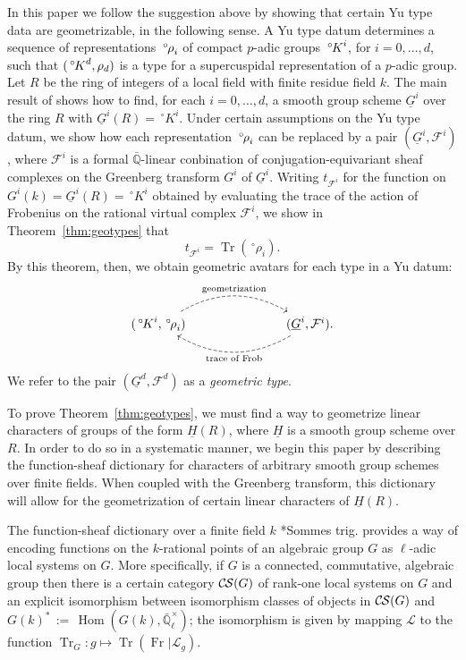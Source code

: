 \documentclass[10pt]{amsart}
\theoremstyle{plain}
\theoremstyle{definition}
\newcommand{\QQ}{{\mathbb{Q}}}
\newcommand{\EE}{\mathbb{\bar Q}_\ell}
\newcommand{\EEx}{\EE^\times}
\newcommand{\Frob}[1]{\operatorname{Fr}_{#1}}
\DeclareMathOperator{\Hom}{Hom}
\DeclareMathOperator{\trace}{Tr}
\newcommand{\ceq}{{\, :=\, }}
\newcommand{\trFrob}[1]{t_{#1}}
\DeclareMathOperator{\Tr}{Tr}
\newcommand{\TrFrob}[1]{\Tr_{#1}}
\newcommand{\cs}[1]{{\mathcal{#1}}}
\newcommand{\CS}{{\mathcal{C\hskip-0.8pt S}}}
\newcommand{\oK}{{\,^\circ \hskip-1pt K}}
\newcommand{\orho}{{\,^\circ \hskip-1pt \rho}}
\begin{document}
In this paper we follow the suggestion above by showing that certain Yu type data are geometrizable, in the following sense.
A Yu type datum determines a sequence of representations $\orho_i$ of compact $p$-adic groups $\oK^i$, for $i=0, \ldots, d$, such that $(\oK^d, \rho_d)$ is a type for a supercuspidal representation of a $p$-adic group.
Let $R$ be the ring of integers of a local field with finite residue field $k$.
The main result of \cite{Yu:models} shows how to find, for each $i=0, \ldots, d$, a smooth group scheme $\underline{G}^i$ over the ring $R$ with $\underline{G}^i(R)=\,^\circ K^i $.
Under certain assumptions on the Yu type datum, we show how each representation $\orho_i$ can be replaced by a pair $(\underline{G}^i, \cs{F}^i)$, where $\cs{F}^i$ is a formal ${\bar\QQ}$-linear conbination of conjugation-equivariant sheaf complexes on the Greenberg transform $G^i$ of $\underline{G}^i$.
%
Writing $\trFrob{\cs{F}^i}$ for the function on $G^i(k) = \underline{G}^i(R) = \,^\circ K^i$ obtained by evaluating the trace of the action of Frobenius on the rational virtual complex $\cs{F}^i$, we show in Theorem~\ref{thm:geotypes} that 
\begin{equation}\label{eqn:intro1}
\trFrob{\cs{F}^i} = \trace(\,^\circ\rho_i).
\end{equation}
By this theorem, then, we obtain geometric avatars for each type in a Yu datum:
\[
\begin{tikzcd}
(\oK^i,\orho_i) \arrow[bend left, dashed]{rrr}{\text{geometrization}} &&& \arrow[bend left, dashed]{lll}{\text{trace of Frob}}
(\underline{G}^i, \cs{F}^i).
\end{tikzcd}
\]
We refer to the pair $(\underline{G}^d, \cs{F}^d)$ as a \emph{geometric type}.

To prove Theorem~\ref{thm:geotypes}, we must find a way to geometrize linear characters of groups of the form $\underline{H}(R)$, where $\underline{H}$ is a smooth group scheme over $R$. 
In order to do so in a systematic manner, we begin this paper by describing the function-sheaf dictionary for characters of arbitrary smooth group schemes over finite fields. 
When coupled with the Greenberg transform, this dictionary will allow for the geometrization of certain linear characters of $\underline{H}(R)$.

The function-sheaf dictionary over a finite field $k$ \cite{deligne:SGA4.5}*{Sommes trig.}
provides a way of encoding functions on the $k$-rational points of an algebraic group $G$
as $\ell$-adic local systems on $G$.  More specifically, if $G$ is a connected, commutative, algebraic group
then there is a certain category $\CS(G)$ of rank-one local systems on $G$ and an
explicit isomorphism between isomorphism classes
of objects in $\CS(G)$ and $G(k)^* \ceq \Hom(G(k), \EEx)$; 
the isomorphism is given by mapping $\cs{L}$ to the function
$\TrFrob{G} : g \mapsto \Tr(\Frob{} \vert \cs{L}_g)$.
\end{document}
